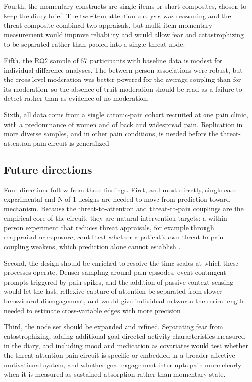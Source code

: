 \documentclass[11pt,a4paper]{article}
\begin{document}
Fourth, the momentary constructs are single items or short composites, chosen to keep the diary
brief. The two-item attention analysis was reassuring and the threat composite combined two
appraisals, but multi-item momentary measurement would improve reliability and would allow fear and
catastrophizing to be separated rather than pooled into a single threat node.

Fifth, the RQ2 sample of 67 participants with baseline data is modest for individual-difference
analyses. The between-person associations were robust, but the cross-level moderation was better
powered for the average coupling than for its moderation, so the absence of trait moderation should
be read as a failure to detect rather than as evidence of no moderation.

Sixth, all data come from a single chronic-pain cohort recruited at one pain clinic, with a
predominance of women and of back and widespread pain. Replication in more diverse samples, and in
other pain conditions, is needed before the threat-attention-pain circuit is generalized.

\subsection{Future directions}
Four directions follow from these findings. First, and most directly, single-case experimental and
N-of-1 designs are needed to move from prediction toward mechanism. Because the threat-to-attention
and threat-to-pain couplings are the empirical core of the circuit, they are natural intervention
targets: a within-person experiment that reduces threat appraisals, for example through
reappraisal or exposure, could test whether a patient's own threat-to-pain coupling weakens, which
prediction alone cannot establish \citep{wright2020personalized,crombez2012fear}.

Second, the design should be enriched to resolve the time scales at which these processes operate.
Denser sampling around pain episodes, event-contingent prompts triggered by pain spikes, and the
addition of passive context sensing would let the fast, reflexive capture of attention be
separated from slower behavioural disengagement, and would give individual networks the series
length needed to estimate cross-variable edges with more precision \citep{beltz2016bridging}.

Third, the node set should be expanded and refined. Separating fear from catastrophizing, adding
additional goal-directed activity characteristics measured in the diary, and including
mood and medication as covariates would test whether the threat-attention-pain circuit is specific
or embedded in a broader affective-motivational system, and whether goal engagement interrupts pain
more clearly when it is measured as sustained absorption rather than momentary state.
\end{document}
